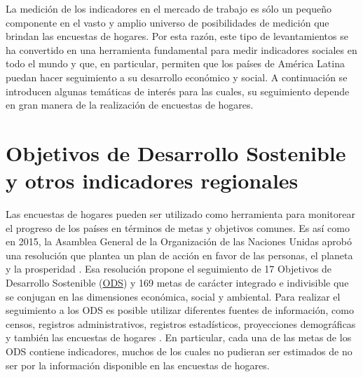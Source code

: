 \documentclass[
  12pt,
]{book}
\begin{document}
La medición de los indicadores en el mercado de trabajo es sólo un pequeño componente en el vasto y amplio universo de posibilidades de medición que brindan las encuestas de hogares. Por esta razón, este tipo de levantamientos se ha convertido en una herramienta fundamental para medir indicadores sociales en todo el mundo y que, en particular, permiten que los países de América Latina puedan hacer seguimiento a su desarrollo económico y social. A continuación se introducen algunas temáticas de interés para las cuales, su seguimiento depende en gran manera de la realización de encuestas de hogares.

\hypertarget{objetivos-de-desarrollo-sostenible-y-otros-indicadores-regionales}{%
\section{Objetivos de Desarrollo Sostenible y otros indicadores regionales}\label{objetivos-de-desarrollo-sostenible-y-otros-indicadores-regionales}}

Las encuestas de hogares pueden ser utilizado como herramienta para monitorear el progreso de los países en términos de metas y objetivos comunes. Es así como en 2015, la Asamblea General de la Organización de las Naciones Unidas aprobó una resolución que plantea un plan de acción en favor de las personas, el planeta y la prosperidad \citep{United_Nations_2015}. Esa resolución propone el seguimiento de 17 Objetivos de Desarrollo Sostenible (\href{https://sustainabledevelopment.un.org}{ODS}) y 169 metas de carácter integrado e indivisible que se conjugan en las dimensiones económica, social y ambiental. Para realizar el seguimiento a los ODS es posible utilizar diferentes fuentes de información, como censos, registros administrativos, registros estadísticos, proyecciones demográficas y también las encuestas de hogares \citep{United_Nations_2016}. En particular, cada una de las metas de los ODS contiene indicadores, muchos de los cuales no pudieran ser estimados de no ser por la información disponible en las encuestas de hogares.
\end{document}
